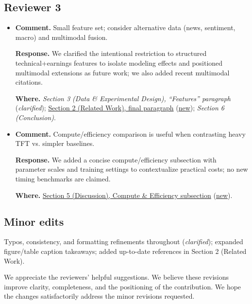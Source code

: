 \documentclass[11pt]{article}
\begin{document}
\subsection*{Reviewer 3}
\begin{itemize}[leftmargin=1.2em]
  \item \textbf{Comment.} Small feature set; consider alternative data (news, sentiment, macro) and multimodal fusion.
  
  \textbf{Response.} We clarified the intentional restriction to structured technical+earnings features to isolate modeling effects and positioned multimodal extensions as future work; we also added recent multimodal citations.
  
  \textbf{Where.} \emph{Section 3 (Data \& Experimental Design), ``Features'' paragraph} (\emph{clarified}); \uline{Section 2 (Related Work), final paragraph} (\uline{new}); \emph{Section 6 (Conclusion)}.

  \item \textbf{Comment.} Compute/efficiency comparison is useful when contrasting heavy TFT vs. simpler baselines.
  
  \textbf{Response.} We added a concise compute/efficiency subsection with parameter scales and training settings to contextualize practical costs; no new timing benchmarks are claimed.
  
  \textbf{Where.} \uline{Section 5 (Discussion), Compute \& Efficiency subsection} (\uline{new}).
\end{itemize}

\subsection*{Minor edits}
Typos, consistency, and formatting refinements throughout (\emph{clarified}); expanded figure/table caption takeaways; added up-to-date references in Section 2 (Related Work).

\bigskip
We appreciate the reviewers’ helpful suggestions. We believe these revisions improve clarity, completeness, and the positioning of the contribution. We hope the changes satisfactorily address the minor revisions requested.
\end{document}
